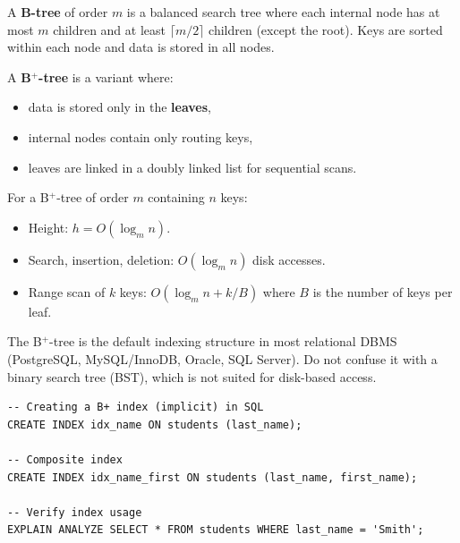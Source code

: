 \begin{definition}
A \textbf{B-tree} of order $m$ is a balanced search tree where each
internal node has at most $m$ children and at least $\lceil m/2 \rceil$
children (except the root). Keys are sorted within each node and data
is stored in all nodes.
\end{definition}

\begin{definition}[B$^+$-tree]
A \textbf{B$^+$-tree} is a variant where:
\begin{itemize}
  \item data is stored only in the \textbf{leaves},
  \item internal nodes contain only routing keys,
  \item leaves are linked in a doubly linked list for sequential scans.
\end{itemize}
\end{definition}

\begin{proposition}
For a B$^+$-tree of order $m$ containing $n$ keys:
\begin{itemize}
  \item Height: $h = O(\log_m n)$.
  \item Search, insertion, deletion: $O(\log_m n)$ disk accesses.
  \item Range scan of $k$ keys: $O(\log_m n + k/B)$ where $B$ is the
        number of keys per leaf.
\end{itemize}
\end{proposition}

\begin{attention}
The B$^+$-tree is the default indexing structure in most relational DBMS
(PostgreSQL, MySQL/InnoDB, Oracle, SQL Server). Do not confuse it with a
binary search tree (BST), which is not suited for disk-based access.
\end{attention}

\begin{verbatim}
-- Creating a B+ index (implicit) in SQL
CREATE INDEX idx_name ON students (last_name);

-- Composite index
CREATE INDEX idx_name_first ON students (last_name, first_name);

-- Verify index usage
EXPLAIN ANALYZE SELECT * FROM students WHERE last_name = 'Smith';
\end{verbatim}

